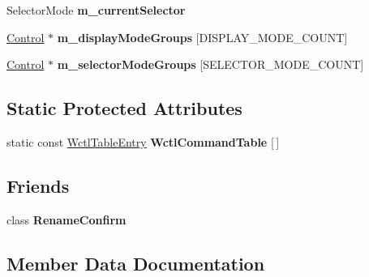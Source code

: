 \begin{DoxyCompactItemize}
\item 
Selector\+Mode {\bfseries m\+\_\+current\+Selector}\hypertarget{classNavComputer_a9dd2729e547b1d3ffc38a8c3f21418c5}{}\label{classNavComputer_a9dd2729e547b1d3ffc38a8c3f21418c5}

\item 
\hyperlink{classControl}{Control} $\ast$ {\bfseries m\+\_\+display\+Mode\+Groups} \mbox{[}D\+I\+S\+P\+L\+A\+Y\+\_\+\+M\+O\+D\+E\+\_\+\+C\+O\+U\+NT\mbox{]}\hypertarget{classNavComputer_a571a978407bb6a1edad09b48d8eb73b6}{}\label{classNavComputer_a571a978407bb6a1edad09b48d8eb73b6}

\item 
\hyperlink{classControl}{Control} $\ast$ {\bfseries m\+\_\+selector\+Mode\+Groups} \mbox{[}S\+E\+L\+E\+C\+T\+O\+R\+\_\+\+M\+O\+D\+E\+\_\+\+C\+O\+U\+NT\mbox{]}\hypertarget{classNavComputer_a0196c9d3ab567241404e2fb301fce572}{}\label{classNavComputer_a0196c9d3ab567241404e2fb301fce572}

\end{DoxyCompactItemize}
\subsection*{Static Protected Attributes}
\begin{DoxyCompactItemize}
\item 
static const \hyperlink{structNavComputer_1_1WctlTableEntry}{Wctl\+Table\+Entry} {\bfseries Wctl\+Command\+Table} \mbox{[}$\,$\mbox{]}
\end{DoxyCompactItemize}
\subsection*{Friends}
\begin{DoxyCompactItemize}
\item 
class {\bfseries Rename\+Confirm}\hypertarget{classNavComputer_af981907308362ca528c71c2cfed752ef}{}\label{classNavComputer_af981907308362ca528c71c2cfed752ef}

\end{DoxyCompactItemize}


\subsection{Member Data Documentation}
